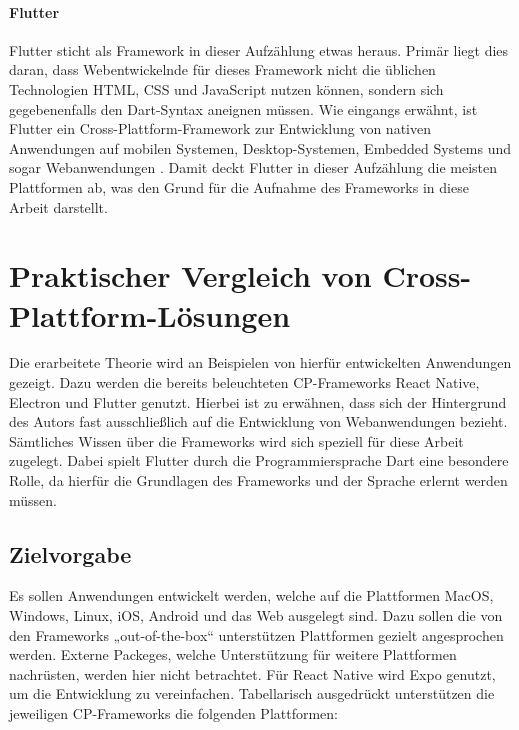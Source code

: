 \documentclass[a4paper]{scrartcl}
\begin{document}
\paragraph{Flutter}

Flutter sticht als Framework in dieser Aufzählung etwas heraus. Primär liegt dies daran, dass Webentwickelnde für dieses Framework nicht die üblichen Technologien HTML, CSS und JavaScript nutzen können, sondern sich gegebenenfalls den Dart-Syntax aneignen müssen. Wie eingangs erwähnt, ist Flutter ein Cross-Plattform-Framework zur Entwicklung von nativen Anwendungen auf mobilen Systemen, Desktop-Systemen, Embedded Systems und sogar Webanwendungen \autocite{Flutter}. Damit deckt Flutter in dieser Aufzählung die meisten Plattformen ab, was den Grund für die Aufnahme des Frameworks in diese Arbeit darstellt.

\newpage

\section{Praktischer Vergleich von Cross-Plattform-Lösungen}

Die erarbeitete Theorie wird an Beispielen von hierfür entwickelten Anwendungen gezeigt. Dazu werden die bereits beleuchteten CP-Frameworks React Native, Electron und Flutter genutzt. Hierbei ist zu erwähnen, dass sich der Hintergrund des Autors fast ausschließlich auf die Entwicklung von Webanwendungen bezieht. Sämtliches Wissen über die Frameworks wird sich speziell für diese Arbeit zugelegt. Dabei spielt Flutter durch die Programmiersprache Dart eine besondere Rolle, da hierfür die Grundlagen des Frameworks und der Sprache erlernt werden müssen.

\subsection{Zielvorgabe}

Es sollen Anwendungen entwickelt werden, welche auf die Plattformen MacOS, Windows, Linux, iOS, Android und das Web ausgelegt sind. Dazu sollen die von den Frameworks „out-of-the-box“ unterstützen Plattformen gezielt angesprochen werden. Externe Packeges, welche Unterstützung für weitere Plattformen nachrüsten, werden hier nicht betrachtet. Für React Native wird Expo genutzt, um die Entwicklung zu vereinfachen. Tabellarisch ausgedrückt unterstützen die jeweiligen CP-Frameworks die folgenden Plattformen:
\end{document}
